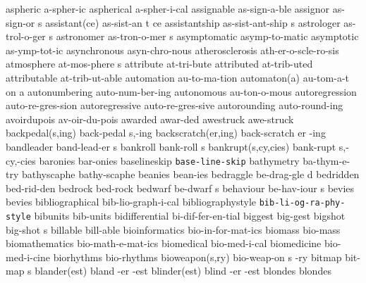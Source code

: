 \1 aspheric		a-spher-ic		%
\1 aspherical		a-spher-i-cal		%
\1 assignable		as-sign-a-ble
\5 assignor		as-sign-or s
\3 assistant(ce)	as-sist-an t ce		%
\5 assistantship	as-sist-ant-ship s
\5 astrologer		as-trol-o-ger s		%
\5 astronomer		as-tron-o-mer s		%
\1 asymptomatic		asymp-to-matic
\1 asymptotic		as-ymp-tot-ic
\1 asynchronous		asyn-chro-nous
\1 atherosclerosis	ath-er-o-scle-ro-sis
\5 atmosphere		at-mos-phere s
\1 attribute		at-tri-bute		%
\1 attributed		at-trib-uted
\1 attributable		at-trib-ut-able
\1 automation		au-to-ma-tion           %
\3 automaton(a)		au-tom-a-t on a         %
\1 autonumbering	auto-num-ber-ing	%
\1 autonomous		au-ton-o-mous		%
\1 autoregression	auto-re-gres-sion	%
\1 autoregressive	auto-re-gres-sive	%
\1 autorounding		auto-round-ing		%
\1 avoirdupois		av-oir-du-pois
\NewWordtrue
\1 awarded		awar-ded		%
\NewWordtrue
\1 awestruck	 	awe-struck		%
\NewWordtrue
\2 backpedal(s,ing)	back-pedal s,-ing	%
\3 backscratch(er,ing)	back-scratch er -ing	%
\5 bandleader		band-lead-er s
\NewWordtrue
\5 bankroll		bank-roll s		%
\2 bankrupt(s,cy,cies)	bank-rupt s,-cy,-cies
\1 baronies		bar-onies
\1 baselineskip 	{\tt\bs base-line-skip}
\1 bathymetry		ba-thym-e-try
\1 bathyscaphe		bathy-scaphe
\1 beanies		bean-ies
\5 bedraggle		be-drag-gle d		%
\1 bedridden		bed-rid-den		%
\1 bedrock		bed-rock		%
\5 bedwarf		be-dwarf s		%
\5 behaviour		be-hav-iour s
\1 bevies		bevies
\1 bibliographical	bib-lio-graph-i-cal	%
\1 bibliographystyle	{\tt\bs bib-li-og-ra-phy-style}
\1 bibunits		bib-units       	%
\1 bidifferential	bi-dif-fer-en-tial
\1 biggest		big-gest
\5 bigshot		big-shot s		%
\1 billable		bill-able
\NewWordtrue
\1 bioinformatics	bio-in-for-mat-ics	%
\NewWordtrue
\1 biomass		bio-mass		%
\1 biomathematics	bio-math-e-mat-ics
\1 biomedical		bio-med-i-cal		%
\1 biomedicine		bio-med-i-cine
\1 biorhythms		bio-rhythms
\3 bioweapon(s,ry)	bio-weap-on s -ry	%
\5 bitmap		bit-map s
\3 blander(est)		bland -er -est
\3 blinder(est)		blind -er -est
\1 blondes		blondes
